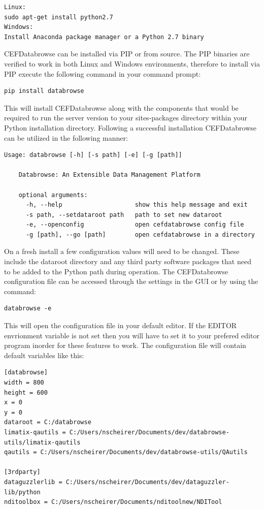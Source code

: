 \documentclass[10pt]{article}
\begin{document}
\begin{verbatim}
Linux:
sudo apt-get install python2.7
Windows:
Install Anaconda package manager or a Python 2.7 binary
\end{verbatim}

CEFDatabrowse can be installed via PIP or from source. The PIP binaries are verified to work in both Linux and Windows environments, therefore to install via PIP execute the following command in your command prompt:

\begin{verbatim}
pip install databrowse
\end{verbatim}

This will install CEFDatabrowse along with the components that would be required to run the server version to your sites-packages directory within your Python installation directory. Following a successful installation CEFDatabrowse can be utilized in the following manner:

\begin{verbatim}
Usage: databrowse [-h] [-s path] [-e] [-g [path]]

    Databrowse: An Extensible Data Management Platform

    optional arguments:
      -h, --help                    show this help message and exit
      -s path, --setdataroot path   path to set new dataroot
      -e, --openconfig              open cefdatabrowse config file
      -g [path], --go [path]        open cefdatabrowse in a directory
\end{verbatim}

On a fresh install a few configuration values will need to be changed. These include the dataroot directory and any third party software packages that need to be added to the Python path during operation. The CEFDatabrowse configuration file can be accessed through the settings in the GUI or by using the command:

\begin{verbatim}
databrowse -e
\end{verbatim}

This will open the configuration file in your default editor. If the EDITOR envrionment variable is not set then you will have to set it to your prefered editor program inorder for these features to work. The configuration file will contain default variables like this:

\begin{verbatim}
[databrowse]
width = 800
height = 600
x = 0
y = 0
dataroot = C:/databrowse
limatix-qautils = C:/Users/nscheirer/Documents/dev/databrowse-utils/limatix-qautils
qautils = C:/Users/nscheirer/Documents/dev/databrowse-utils/QAutils

[3rdparty]
dataguzzlerlib = C:/Users/nscheirer/Documents/dev/dataguzzler-lib/python
nditoolbox = C:/Users/nscheirer/Documents/nditoolnew/NDITool
\end{verbatim}
\end{document}
